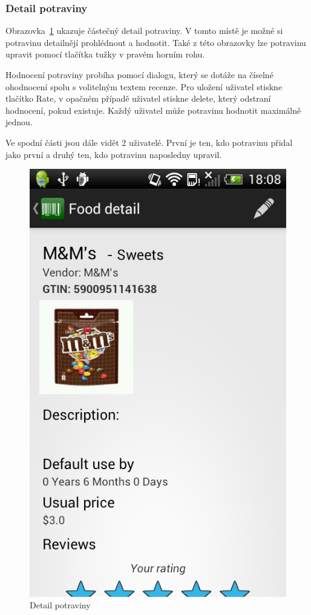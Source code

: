 \documentclass[thesis=B,czech]{FITthesis}[2013/10/20]
\begin{document}
\clearpage

\subsubsection{Detail potraviny}

Obrazovka~\ref{fig:AppFoodDetail} ukazuje částečný detail potraviny. V tomto místě je možné si potravinu detailnějí prohlédnout a hodnotit. Také z této obrazovky lze potravinu upravit pomocí tlačítka tužky v pravém horním rohu.

Hodnocení potraviny probíha pomocí dialogu, který se dotáže na číselné ohodnocení spolu s volitelným textem recenze. Pro uložení uživatel stiskne tlačítko Rate, v opačném případě uživatel stiskne delete, který odstraní hodnocení, pokud existuje. Každý uživatel může potravinu hodnotit maximálně jednou.

Ve spodní části jsou dále vidět 2 uživatelé. První je ten, kdo potravinu přidal jako první a druhý ten, kdo potravinu naposledny upravil.

\begin{figure}[H]
  \centering
  \includegraphics[scale=0.4]{screenshots/app_food_detail.png}
  \caption{Detail potraviny}
  \label{fig:AppFoodDetail}
\end{figure}
\end{document}
